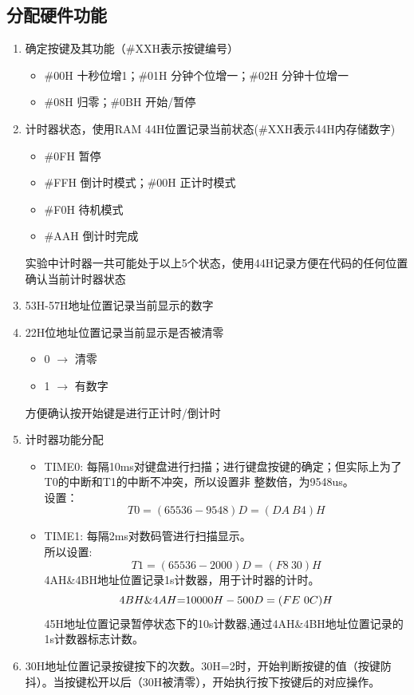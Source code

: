 \documentclass{article}
\begin{document}
\subsection{分配硬件功能}
\begin{enumerate}
    \item 确定按键及其功能（\#XXH表示按键编号）
    \begin{itemize}
        \item \#00H 十秒位增1；\#01H 分钟个位增一；\#02H 分钟十位增一
        \item \#08H 归零；\#0BH 开始/暂停
    \end{itemize}
    \item 计时器状态，使用RAM 44H位置记录当前状态(\#XXH表示44H内存储数字)
    \begin{itemize}
        \item \#0FH 暂停
        \item \#FFH 倒计时模式；\#00H 正计时模式
        \item \#F0H 待机模式
        \item \#AAH 倒计时完成
    \end{itemize}
    实验中计时器一共可能处于以上5个状态，使用44H记录方便在代码的任何位置确认当前计时器状态
    \item 53H-57H地址位置记录当前显示的数字
    \item 22H位地址位置记录当前显示是否被清零
    \begin{itemize}
        \item 0 $\rightarrow$ 清零
        \item 1 $\rightarrow$ 有数字
    \end{itemize}
    方便确认按开始键是进行正计时/倒计时
    \item 计时器功能分配
    \begin{itemize}
        \item TIME0: 每隔10ms对键盘进行扫描；进行键盘按键的确定；但实际上为了T0的中断和T1的中断不冲突，所以设置非
        整数倍，为9548us。\\
        设置：
        $$
        T0=(65536-9548)D=(DA\ B4)H
        $$
        \item TIME1: 每隔2ms对数码管进行扫描显示。\\
        所以设置:
        $$
        T1=(65536-2000)D=(F8\ 30)H
        $$
        4AH\&4BH地址位置记录1s计数器，用于计时器的计时。
        $$
        4BH\&4AH\text=10000H-500D=(FE\ 0C)H
        $$
        45H地址位置记录暂停状态下的10s计数器,通过4AH\&4BH地址位置记录的1s计数器标志计数。
    \end{itemize}
    \item 30H地址位置记录按键按下的次数。30H=2时，开始判断按键的值（按键防抖）。当按键松开以后（30H被清零），开始执行按下按键后的对应操作。
\end{enumerate}
\end{document}
